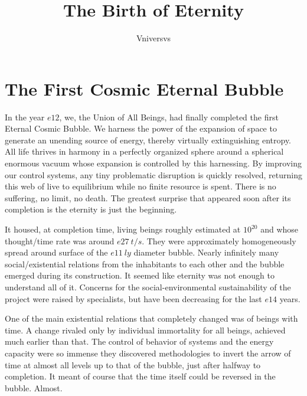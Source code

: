 \documentclass[]{article}
\title{The Birth of Eternity}
\author{Vniversvs}
\begin{document}
	
	\maketitle
	
	\begin{abstract}
		
	\end{abstract}
	
	\section{The First Cosmic Eternal Bubble}
	
	In the year $e12$, we, the Union of All Beings, had finally completed the first Eternal Cosmic Bubble. We harness the power of the expansion of space to generate an unending source of energy, thereby virtually extinguishing entropy. All life thrives in harmony in a perfectly organized sphere around a spherical enormous vacuum whose expansion is controlled by this harnessing. By improving our control systems, any tiny problematic disruption is quickly resolved, returning this web of live to equilibrium while no finite resource is spent. There is no suffering, no limit, no death. The greatest surprise that appeared soon after its completion is the eternity is just the beginning.
	
	It housed, at completion time, living beings roughly estimated at $10^{20}$ and whose thought/time rate was around $e27 \ t/s$. They were approximately homogeneously spread around surface of the $e11 \ ly$ diameter bubble. Nearly infinitely many social/existential relations from the inhabitants to each other and the bubble emerged during its construction. It seemed like eternity was not enough to understand all of it. Concerns for the social-environmental sustainability of the project were raised by specialists, but have been decreasing for the last $e14$ years. 
	
	
	
	One of the main existential relations that completely changed was of beings with time. A change rivaled only by individual immortality for all beings, achieved much earlier than that. The control of behavior of systems and the energy capacity were so immense they discovered methodologies to invert the arrow of time at almost all levels up to that of the bubble, just after halfway to completion. It meant of course that the time itself could be reversed in the bubble. Almost.
	
	
	
\end{document}
